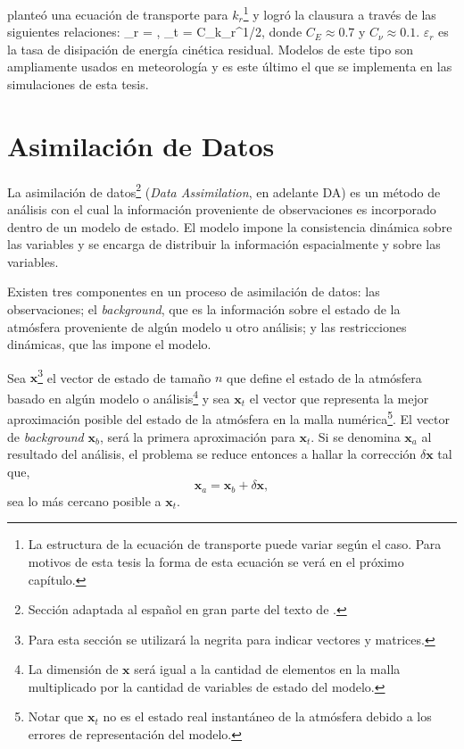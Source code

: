 \cite{deardorff1974three} planteó una ecuación de transporte para $k_r$\footnote{La estructura de la ecuación de transporte puede variar según el caso. Para motivos de esta tesis la forma de esta ecuación se verá en el próximo capítulo.} y logró la clausura a través de las siguientes relaciones:
\be \varepsilon_r = , \ee
\be \nu_t = C_\nu k_r^{1/2}\Delta, \ee
donde $C_E\approx 0.7$ y $C_\nu\approx 0.1$. $\varepsilon_r$ es la tasa de disipación de energía cinética residual. Modelos de este tipo son ampliamente usados en meteorología y es este último el que se implementa en las simulaciones de esta tesis.




\newpage
\section{Asimilación de Datos}
La asimilación de datos\footnote{Sección adaptada al español en gran parte del texto de \cite{warner2010numerical}.} (\emph{Data Assimilation}, en adelante DA) es un método de análisis con el cual la información proveniente de observaciones es incorporado dentro de un modelo de estado. El modelo impone la consistencia dinámica sobre las variables y se encarga de distribuir la información espacialmente y sobre las variables.

Existen tres componentes en un proceso de asimilación de datos: las observaciones; el \emph{background}, que es la información sobre el estado de la atmósfera proveniente de algún modelo u otro análisis; y las restricciones dinámicas, que las impone el modelo.

Sea $\mathbf{x}$\footnote{Para esta sección se utilizará la negrita para indicar vectores y matrices.} el vector de estado de tamaño $n$ que define el estado de la atmósfera basado en algún modelo o análisis\footnote{La dimensión de $\mathbf{x}$ será igual a la cantidad de elementos en la malla multiplicado por la cantidad de variables de estado del modelo.} y sea $\mathbf{x}_t$ el vector que representa la mejor aproximación posible del estado de la atmósfera en la malla numérica\footnote{Notar que $\mathbf{x}_t$ no es el estado real instantáneo de la atmósfera debido a los errores de representación del modelo.}. El vector de \emph{background} $\mathbf{x}_b$, será la primera aproximación para $\mathbf{x}_t$. Si se denomina $\mathbf{x}_a$ al resultado del análisis, el problema se reduce entonces a hallar la corrección $\delta \mathbf{x}$ tal que,
\begin{equation*}
	\mathbf{x}_a = \mathbf{x}_b + \delta \mathbf{x},
\end{equation*}
sea lo más cercano posible a $\mathbf{x}_t$.

